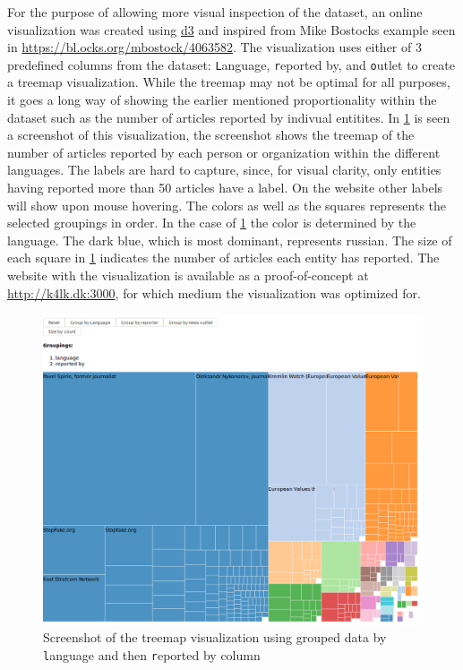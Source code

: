 \documentclass{article}
\begin{document}
For the purpose of allowing more visual inspection of the dataset, an online visualization was created using \href{https://d3js.org}{d3} and inspired from Mike Bostocks example seen in \url{https://bl.ocks.org/mbostock/4063582}. The visualization uses either of 3 predefined columns from the dataset: {\texttt Language}, {\texttt reported by}, and {\texttt outlet} to create a treemap visualization. While the treemap may not be optimal for all purposes, it goes a long way of showing the earlier mentioned proportionality within the dataset such as the number of articles reported by indivual entitites. In \cref{fig:viz4kidz} is seen a screenshot of this visualization, the screenshot shows the treemap of the number of articles reported by each person or organization within the different languages. The labels are hard to capture, since, for visual clarity, only entities having reported more than 50 articles have a label. On the website other labels will show upon mouse hovering. The colors as well as the squares represents the selected groupings in order. In the case of \cref{fig:viz4kidz} the color is determined by the language. The dark blue, which is most dominant, represents russian. The size of each square in \cref{fig:viz4kidz} indicates the number of articles each entity has reported. The website with the visualization is available as a proof-of-concept at \url{http://k4lk.dk:3000}, for which medium the visualization was optimized for.
\begin{figure}[H]
\caption{Screenshot of the treemap visualization using grouped data by {\texttt language} and then {\texttt reported by} column}
\label{fig:viz4kidz}
\includegraphics[width=\textwidth]{images/reportedBy_perLanguage_sizeByCount.png}
\end{figure}
\end{document}
